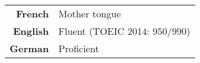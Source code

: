 
\begin{tabularx}{\textwidth}{@{}d X@{}}
  \textbf{French} & Mother tongue\\
  \textbf{English} & Fluent (\textcolor{english}{TOEIC 2014: $950 / 990$})\\
  \textbf{German} & Proficient\\
\end{tabularx}

%


